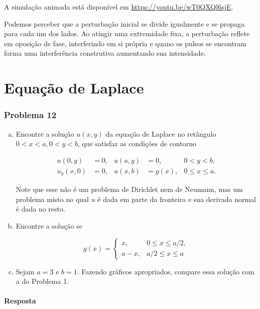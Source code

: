 \documentclass[12pt, a4paper, portuguese]{fphw}
\begin{document}
A simulação animada está disponível em \url{https://youtu.be/wT0QXQl6sjE}.

Podemos perceber que a perturbação inicial se divide igualmente e se propaga para cada um dos lados. Ao atingir uma extremidade fixa, a perturbação reflete em oposição de fase, interferindo em si própria e quano os pulsos se encontram forma uma interferência construtiva aumentando sua intensidade.

\part{Equação de Laplace}

\section*{Problema 12}

\begin{problem}
	\begin{enumerate}[(a)]
		
		\item Encontre a solução $ u(x, y) $ da equação de Laplace no retângulo $ 0 < x < a, 0 < y < b $, que satisfaz as condições de contorno
		
		$$
		\begin{aligned}
			u(0, y)   &= 0, & u(a, y) &= 0,    & 0 < y < b, \\
			u_y(x, 0) &= 0, & u(x, b) &= g(x), & 0 \le x \le a.
		\end{aligned}
		$$
		
		Note que esse não é um problema de Dirichlet nem de Neumann, mas um problema misto no qual $ u $ é dada em parte da fronteira e sua derivada normal é dada no resto.
		
		\item Encontre a solução se
		
		$$
		g(x) = \begin{cases}
		x,     & 0 \le x \le a/2, \\
		a - x, & a/2 \le x \le a
		\end{cases}
		$$
		
		\item Sejam $ a = 3 $ e $ b = 1 $. Fazendo gráficos apropriados, compare essa solução com a do Problema 1.
		
	\end{enumerate}
\end{problem}

\subsection*{Resposta}
\end{document}
